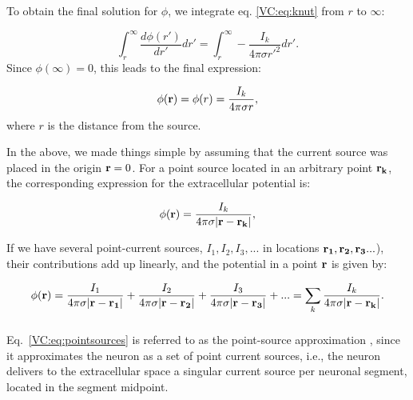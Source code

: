 To obtain the final solution for $\phi$, we integrate eq. \ref{VC:eq:knut} from $r$ to $\infty$:

\begin{equation}
\int_r^{\infty} \frac{d\phi(r')}{dr'} dr' = \int_r^{\infty} -\frac{I_k}{4\pi \sigma r'^2 } dr'.
\label{VC:eq:knut2}
\end{equation}
Since $\phi({\infty}) = 0$, this leads to the final expression:

\begin{equation}
\phi({\bf r}) = \phi(r) = \frac{I_k}{4\pi \sigma r},
\label{VC:eq:pointsource}
\end{equation}
where $r$ is the distance from the source.

In the above, we made things simple by assuming that the current source was placed in the origin ${\bf r} = 0$. For a point source located in an arbitrary point ${\bf r_k} $, the corresponding expression for the extracellular potential is:

\begin{equation}
\phi({\bf r}) = \frac{I_k}{4\pi \sigma |{\bf r-r_k}|},
\label{VC:eq:pointsource2}
\end{equation}

If we have several point-current sources, $I_{1}, I_2, I_3, ... $ in locations ${\bf r_1}, {\bf r_2}, {\bf r_3} ... $), their contributions add up linearly, and the potential in a point ${\bf r}$ is given by:

\begin{equation}
\phi({\bf r}) = \frac{I_1}{4\pi  \sigma {\bf |r-r_1|}} + \frac{I_2}{4\pi  \sigma {\bf |r-r_2|} } + \frac{I_3}{4\pi  \sigma {\bf |r-r_3|} } + ... = \sum_k \frac{I_k}{4\pi  \sigma {\bf |r-r_k|} }.
\label{VC:eq:pointsources}
\end{equation}


\subsubsection{}
\label{sec:VC:linesource}

Eq.~\ref{VC:eq:pointsources} is referred to as the point-source approximation \citep{Holt1999, Pettersen2008a}, since it approximates the neuron as a set of point current sources, i.e., the neuron delivers to the extracellular space a singular current source per neuronal segment, located in the segment midpoint. 

